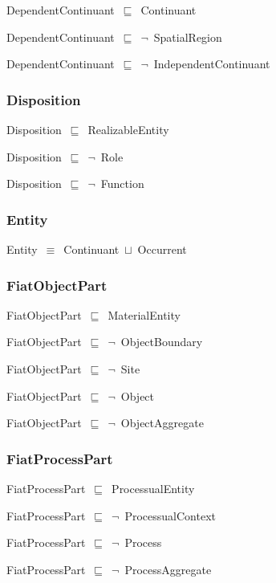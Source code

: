 \documentclass{article}
\begin{document}
DependentContinuant~\ensuremath{\sqsubseteq}~Continuant~

DependentContinuant~\ensuremath{\sqsubseteq}~\ensuremath{\lnot}~SpatialRegion

DependentContinuant~\ensuremath{\sqsubseteq}~\ensuremath{\lnot}~IndependentContinuant

\subsubsection*{Disposition}

Disposition~\ensuremath{\sqsubseteq}~RealizableEntity~

Disposition~\ensuremath{\sqsubseteq}~\ensuremath{\lnot}~Role

Disposition~\ensuremath{\sqsubseteq}~\ensuremath{\lnot}~Function

\subsubsection*{Entity}

Entity~\ensuremath{\equiv}~Continuant~\ensuremath{\sqcup}~Occurrent

\subsubsection*{FiatObjectPart}

FiatObjectPart~\ensuremath{\sqsubseteq}~MaterialEntity~

FiatObjectPart~\ensuremath{\sqsubseteq}~\ensuremath{\lnot}~ObjectBoundary

FiatObjectPart~\ensuremath{\sqsubseteq}~\ensuremath{\lnot}~Site

FiatObjectPart~\ensuremath{\sqsubseteq}~\ensuremath{\lnot}~Object

FiatObjectPart~\ensuremath{\sqsubseteq}~\ensuremath{\lnot}~ObjectAggregate

\subsubsection*{FiatProcessPart}

FiatProcessPart~\ensuremath{\sqsubseteq}~ProcessualEntity~

FiatProcessPart~\ensuremath{\sqsubseteq}~\ensuremath{\lnot}~ProcessualContext

FiatProcessPart~\ensuremath{\sqsubseteq}~\ensuremath{\lnot}~Process

FiatProcessPart~\ensuremath{\sqsubseteq}~\ensuremath{\lnot}~ProcessAggregate
\end{document}
